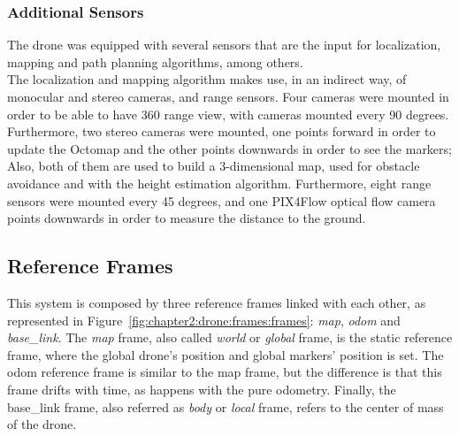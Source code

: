 \subsubsection{Additional Sensors}
The drone was equipped with several sensors that are the input for localization, mapping and path planning algorithms, among others.\\

The localization and mapping algorithm makes use, in an indirect way, of monocular and stereo cameras, and range sensors. Four cameras were mounted in order to be able to have 360 range view, with cameras mounted every 90 degrees. Furthermore, two stereo cameras were mounted, one points forward in order to update the Octomap and the other points downwards in order to see the markers; Also, both of them are used to build a 3-dimensional map, used for obstacle avoidance and with the height estimation algorithm. Furthermore, eight range sensors were mounted every 45 degrees, and one PIX4Flow optical flow camera points downwards in order to measure the distance to the ground.

\subsection{Reference Frames}
\label{subsec:chapter2:drone:frames}
This system is composed by three reference frames linked with each other, as represented in Figure~\ref{fig:chapter2:drone:frames:frames}: \emph{map}, \emph{odom} and \emph{base\_link}. The \emph{map} frame, also called \emph{world} or \emph{global} frame, is the static reference frame, where the global drone's position and global markers' position is set. The odom reference frame is similar to the map frame, but the difference is that this frame drifts with time, as happens with the pure odometry. Finally, the base\_link frame, also referred as \emph{body} or \emph{local} frame, refers to the center of mass of the drone.\\

